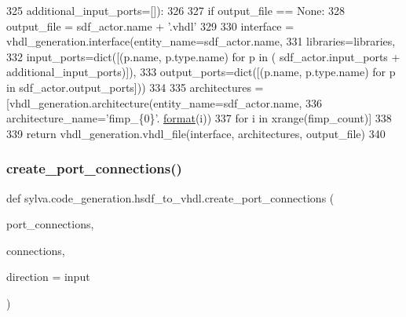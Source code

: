 \begin{DoxyCode}
325                       additional\_input\_ports=[]):
326 
327     \textcolor{keywordflow}{if} output\_file == \textcolor{keywordtype}{None}:
328         output\_file = sdf\_actor.name + \textcolor{stringliteral}{'.vhdl'}
329 
330     interface = vhdl\_generation.interface(entity\_name=sdf\_actor.name,
331                                           libraries=libraries,
332                                           input\_ports=dict([(p.name, p.type.name) \textcolor{keywordflow}{for} p \textcolor{keywordflow}{in} (
      sdf\_actor.input\_ports + additional\_input\_ports)]),
333                                           output\_ports=dict([(p.name, p.type.name) \textcolor{keywordflow}{for} p \textcolor{keywordflow}{in} 
      sdf\_actor.output\_ports]))
334 
335     architectures = [vhdl\_generation.architecture(entity\_name=sdf\_actor.name,
336                                                   architecture\_name=\textcolor{stringliteral}{'fimp\_\{0\}'}.
      \hyperlink{namespacesylva_1_1examples_1_1hsdfg_ab3510a0b8457362330aa4d9fd2209590}{format}(i))
337                      \textcolor{keywordflow}{for} i \textcolor{keywordflow}{in} xrange(fimp\_count)]
338 
339     \textcolor{keywordflow}{return} vhdl\_generation.vhdl\_file(interface, architectures, output\_file)
340 \end{DoxyCode}
\mbox{\label{namespacesylva_1_1code__generation_1_1hsdf__to__vhdl_a32b4f40eadeb985a68674b401be7a1dc}} 
\subsubsection{\texorpdfstring{create\+\_\+port\+\_\+connections()}{create\_port\_connections()}}
{\footnotesize\ttfamily def sylva.\+code\+\_\+generation.\+hsdf\+\_\+to\+\_\+vhdl.\+create\+\_\+port\+\_\+connections (\begin{DoxyParamCaption}\item[{}]{port\+\_\+connections,  }\item[{}]{connections,  }\item[{}]{direction = {\ttfamily \textquotesingle{}input\textquotesingle{}} }\end{DoxyParamCaption})}

